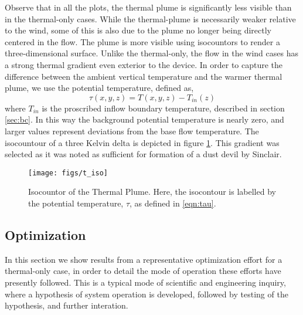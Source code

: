 Observe that in all the plots, the thermal plume is significantly less
visible than in the thermal-only cases. While the
thermal-plume is necessarily weaker relative to the wind, some of this
is also due to the plume no longer being directly centered in the
flow. The plume is more visible using isocountors to render a
three-dimensional surface. Unlike the thermal-only, the flow in the wind
cases has a strong thermal gradient even exterior to the device. In
order to capture the difference between the ambient vertical temperature
and the warmer thermal plume, we use the potential temperature, defined
as, 
\begin{equation}
  \tau(x,y,z) = T(x,y,z) -T_{in}(z) 
   \label{eqn:tau}
\end{equation}
where $T_{in}$ is the proscribed inflow boundary temperature, described
in section \ref{sec:bc}. In this way the background potential
temperature is nearly zero, and larger values represent deviations from
the base flow temperature. The isocountour of a three Kelvin delta is 
depicted in figure \ref{fig:field_real}. This gradient was selected as
it was noted as sufficient for formation of a dust devil by
Sinclair\cite{Sinclair1969}.

%
%
  \begin{figure}[!htb]
   \begin{center}
    \texttt{[image: figs/t\_iso]}
    \caption{Isocountor of the Thermal Plume. Here, the isocontour is
    labelled by the potential temperature, $\tau$, as defined in \ref{eqn:tau}.}
    \label{fig:field_real}
   \end{center}
  \end{figure}

\subsection{Optimization}

In this section we show results from a representative optimization
effort for a thermal-only case, in order to detail the mode of operation
these efforts have presently followed. This is a typical mode of
scientific and engineering inquiry, where a hypothesis of system
operation is developed, followed by testing of the hypothesis, and
further interation. 

